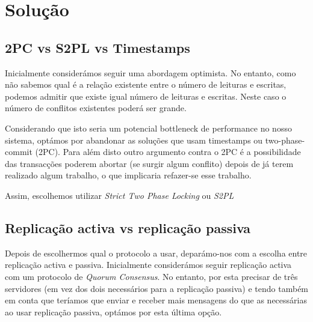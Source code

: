 \section{Solução}

\subsection{2PC vs S2PL vs Timestamps}

Inicialmente considerámos seguir uma abordagem optimista. No entanto, como não sabemos qual é a relação existente entre o número de leituras e escritas, podemos admitir que existe igual número de leituras e escritas. Neste caso o número de conflitos existentes poderá ser grande. 

Considerando que isto seria um potencial bottleneck de performance no nosso sistema, optámos por abandonar as soluções que usam timestamps ou two-phase-commit (2PC). Para além disto outro argumento contra o 2PC é a possibilidade das transacções poderem abortar (se surgir algum conflito) depois de já terem realizado algum trabalho, o que implicaria refazer-se esse trabalho.

Assim, escolhemos utilizar \textit{Strict Two Phase Locking} ou \textit{S2PL}

\subsection{Replicação activa vs replicação passiva}

Depois de escolhermos qual o protocolo a usar, deparámo-nos com a escolha entre replicação activa e passiva. Inicialmente considerámos seguir replicação activa com um protocolo de \textit{Quorum Consensus}. No entanto, por esta precisar de três servidores (em vez dos dois necessários para a replicação passiva) e tendo também em conta que teríamos que enviar e receber mais mensagens do que as necessárias ao usar replicação passiva, optámos por esta última opção.
